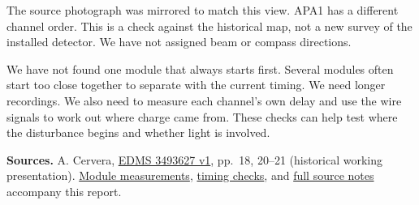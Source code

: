 \documentclass[12pt,a4paper]{article}
\newcommand{\heading}[1]{\par\vspace{6pt}{\large\bfseries #1}\par}
\begin{document}
The source photograph was mirrored to match this view. APA1 has a different
channel order. This is a check against the historical map, not a new survey
of the installed detector. We have not assigned beam or compass directions.

\heading{What we still need to learn}
We have not found one module that always starts first. Several modules often
start too close together to separate with the current timing. We need longer
recordings. We also need to measure each channel's own delay and use the wire
signals to work out where charge came from. These checks can help test where
the disturbance begins and whether light is involved.

{\small\color{muted}
\textbf{Sources.} A. Cervera, \href{https://edms.cern.ch/document/3493627/1}{EDMS 3493627 v1},
pp.\ 18, 20--21 (historical working presentation).
\href{../../../ground-shake-data/analysis/apa1-apa2-response-20261103/MODULES.txt}{Module measurements},
\href{../../../ground-shake-data/analysis/module-first-histogram-20261104/README.txt}{timing checks},
and \href{README.md}{full source notes} accompany this report.
}
\end{document}
